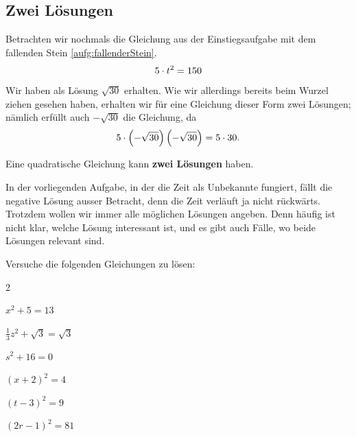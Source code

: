 \documentclass[11pt,oneside]{article}
\begin{document}
\subsection{Zwei Lösungen}
	Betrachten wir nochmals die Gleichung aus der Einstiegsaufgabe mit dem fallenden Stein \ref{aufg:fallenderStein}.
	\[5\cdot t^2=150\]
	Wir haben als Lösung $\sqrt{30}$ erhalten. Wie wir allerdings bereits beim Wurzel ziehen gesehen haben, erhalten wir für eine Gleichung dieser Form zwei Lösungen; nämlich erfüllt auch $-\sqrt{30}$ die Gleichung, da\[5\cdot\left(-\sqrt{30}\right)\left(-\sqrt{30}\right)=5\cdot30.\]
	\begin{satz}
		Eine quadratische Gleichung kann \textbf{zwei Lösungen} haben.
	\end{satz}
	In der vorliegenden Aufgabe, in der die Zeit als Unbekannte fungiert, fällt die negative Lösung ausser Betracht, denn die Zeit verläuft ja nicht rückwärts. Trotzdem wollen wir immer alle möglichen Lösungen angeben. Denn häufig ist nicht klar, welche Lösung interessant ist, und es gibt auch Fälle, wo beide Lösungen relevant sind.
	\begin{aufgabe}
		Versuche die folgenden Gleichungen zu lösen:
		\begin{enumerate}[label=\alph*)]\end{enumerate}
	\end{aufgabe}
\end{document}

